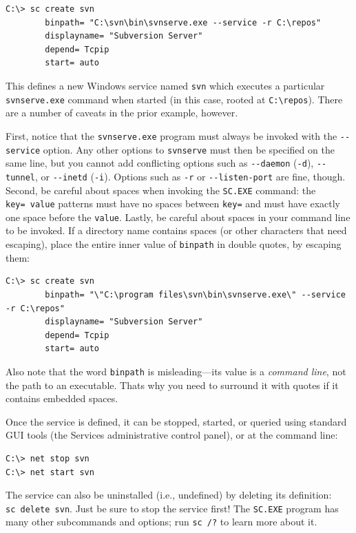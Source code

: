 \begin{verbatim}
C:\> sc create svn
        binpath= "C:\svn\bin\svnserve.exe --service -r C:\repos"
        displayname= "Subversion Server"
        depend= Tcpip
        start= auto
\end{verbatim}

This defines a new Windows service named \texttt{svn} which executes a
particular \texttt{svnserve.exe} command when started (in this case,
rooted at \texttt{C:\textbackslash{}repos}). There are a number of
caveats in the prior example, however.

First, notice that the \texttt{svnserve.exe} program must always be
invoked with the \texttt{-\/-service} option. Any other options to
\texttt{svnserve} must then be specified on the same line, but you
cannot add conflicting options such as \texttt{-\/-daemon}
(\texttt{-d}), \texttt{-\/-tunnel}, or \texttt{-\/-inetd} (\texttt{-i}).
Options such as \texttt{-r} or \texttt{-\/-listen-port} are fine,
though. Second, be careful about spaces when invoking the
\texttt{SC.EXE} command: the \texttt{key=\ value} patterns must have no
spaces between \texttt{key=} and must have exactly one space before the
\texttt{value}. Lastly, be careful about spaces in your command line to
be invoked. If a directory name contains spaces (or other characters
that need escaping), place the entire inner value of \texttt{binpath} in
double quotes, by escaping them:

\begin{verbatim}
C:\> sc create svn
        binpath= "\"C:\program files\svn\bin\svnserve.exe\" --service -r C:\repos"
        displayname= "Subversion Server"
        depend= Tcpip
        start= auto
\end{verbatim}

Also note that the word \texttt{binpath} is misleading---its value is a
\emph{command line}, not the path to an executable.
That\textquotesingle s why you need to surround it with quotes if it
contains embedded spaces.

Once the service is defined, it can be stopped, started, or queried
using standard GUI tools (the Services administrative control panel), or
at the command line:

\begin{verbatim}
C:\> net stop svn
C:\> net start svn
\end{verbatim}

The service can also be uninstalled (i.e., undefined) by deleting its
definition: \texttt{sc\ delete\ svn}. Just be sure to stop the service
first! The \texttt{SC.EXE} program has many other subcommands and
options; run \texttt{sc\ /?} to learn more about it.

